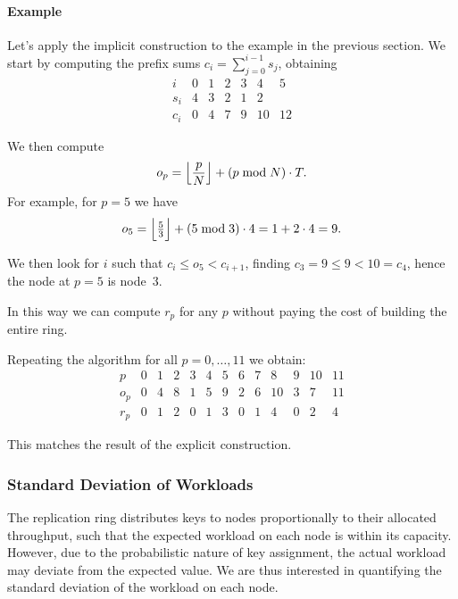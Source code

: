 \paragraph{Example}
Let's apply the implicit construction to the example in the previous section.
We start by computing the prefix sums $c_i = \sum_{j=0}^{i-1} s_j$, obtaining
\[
    \begin{array}{c|cccccc}
        i   & 0 & 1 & 2 & 3 &  4 &  5 \\ \hline
        s_i & 4 & 3 & 2 & 1 &  2 &    \\ \hline
        c_i & 0 & 4 & 7 & 9 & 10 & 12
    \end{array}
\]

We then compute
\[
    o_p = \Bigl\lfloor \frac{p}{N} \Bigr\rfloor + (p \bmod N) \cdot T.
\]
For example, for $p = 5$ we have
\[
    o_5 = \Bigl\lfloor \tfrac{5}{3} \Bigr\rfloor + (5 \bmod 3) \cdot 4 =
    1 + 2\cdot4 = 9.
\]

We then look for $i$ such that $c_i \leq o_5 < c_{i+1}$, finding $c_3 = 9 \leq
9 < 10 = c_4$, hence the node at $p = 5$ is node~$3$.

In this way we can compute $r_p$ for any $p$ without paying the cost of
building the entire ring.

Repeating the algorithm for all $p = 0, \dots, 11$ we obtain:
\[
    \begin{array}{c|cccccccccccc}
        p   & 0 & 1 & 2 & 3 & 4 & 5 & 6 & 7 &  8 & 9 & 10 & 11 \\ \hline
        o_p & 0 & 4 & 8 & 1 & 5 & 9 & 2 & 6 & 10 & 3 &  7 & 11 \\ \hline
        r_p & 0 & 1 & 2 & 0 & 1 & 3 & 0 & 1 &  4 & 0 &  2 &  4
    \end{array}
\]

This matches the result of the explicit construction.

\subsubsection{Standard Deviation of Workloads}
\label{subsubsec:stddev}

The replication ring distributes keys to nodes proportionally to their
allocated throughput, such that the expected workload on each node is within its
capacity.
However, due to the probabilistic nature of key assignment, the actual workload
may deviate from the expected value.
We are thus interested in quantifying the standard deviation of the workload on
each node.

